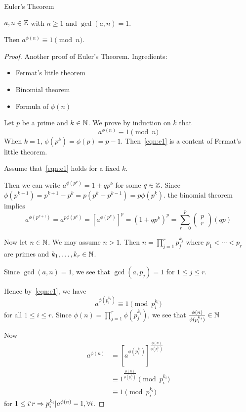 

\begin{theorem}
    Euler's Theorem 

    $a, n \in \mathbb{Z}$ with $n \geq 1$ and $\gcd(a, n) = 1$.

    Then $a^{\phi(n)} \equiv 1 \pmod n$.
\end{theorem}
\begin{proof}
    Another proof of Euler's Theorem.
    Ingredients:
    \begin{itemize}
        \item Fermat's little theorem
        \item Binomial theorem
        \item Formula of $\phi(n)$
    \end{itemize}

    Let $p$ be a prime and $k \in \mathbb{N}$.
    We prove by induction on $k$ that
    \[
        \tag{1}
        a^{\phi(n)} \equiv 1 \pmod n
        \label{eqn:e1}
    \]
    When $k = 1$, $\phi(p^k) = \phi(p) = p - 1$. Then~\eqref{eqn:e1} is
    a content of Fermat's little theorem.

    Assume that~\eqref{eqn:e1} holds for a fixed $k$.

    Then we can write $a^{\phi(p^k)} = 1 + qp^k$ for some $q \in \mathbb{Z}$.
    Since $\phi(p^{k+1}) = p^{k+1} - p^k = p(p^k - p^{k-1}) = p \phi(p^k)$.
    the binomial theorem implies
    \[
        a^{\phi(p^{k+1})} = a^{p\phi(p^k)} = {[a^{\phi(p^k)}]}^p = {(1+qp^k)}^p
        = \sum_{r=0}^{p}{
            \left(
                \begin{array}{c}
                    p \\
                    r
                \end{array}
            \right)
            (qp)
        }
    \]

    Now let $n \in \mathbb{N}$. We may assume $n > 1$.
    Then $n = \prod_{j=1}^{r}{p_{j}^{k_j}}$ where $p_1 < \cdots < p_r$ are
    primes and $k_1, \dots, k_r \in \mathbb{N}$.

    Since $\gcd(a, n) = 1$, we see that $\gcd(a, p_j) = 1$ for $1 \leq j \leq r$.

    Hence by~\eqref{eqn:e1}, we have 
    \[
        a^{\phi(p_i^{k_i})} \equiv 1 \pmod {p_i^{k_i}}
    \]
    for all $1 \leq i \leq r$.
    Since $\phi(n) = \prod_{j=1}^{r}{\phi(p_j^{k_j})}$, we see that
    $\frac{\phi(n)}{\phi(p_i^{k_i})} \in \mathbb{N}$

    Now 
    \[
        \begin{aligned}
            a^{\phi(n)} &= {[a^{\phi(p_i^{k_i})}]}^\frac{\phi(n)}{\phi(p_i^{k_i})} \\
            &\equiv 1^\frac{\phi(n)}{\phi(p_i^{k_i})} \pmod p_i^{k_i} \\
            &\equiv 1 \pmod p_i^{k_i}
        \end{aligned}
    \]
    for $1 \leq i \lq r \Rightarrow p_i^{k_i} | a^{\phi(n)} - 1, \forall i$.


\end{proof}

